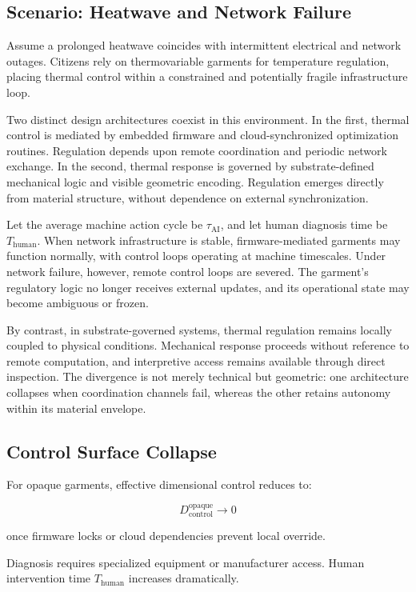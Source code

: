 \documentclass[11pt]{article}
\begin{document}
\subsection{Scenario: Heatwave and Network Failure}

Assume a prolonged heatwave coincides with intermittent electrical and
network outages. Citizens rely on thermovariable garments for
temperature regulation, placing thermal control within a constrained and
potentially fragile infrastructure loop.

Two distinct design architectures coexist in this environment. In the
first, thermal control is mediated by embedded firmware and
cloud-synchronized optimization routines. Regulation depends upon remote
coordination and periodic network exchange. In the second, thermal
response is governed by substrate-defined mechanical logic and visible
geometric encoding. Regulation emerges directly from material structure,
without dependence on external synchronization.

Let the average machine action cycle be $\tau_{\text{AI}}$, and let human
diagnosis time be $T_{\text{human}}$. When network infrastructure is
stable, firmware-mediated garments may function normally, with control
loops operating at machine timescales. Under network failure, however,
remote control loops are severed. The garment's regulatory logic no
longer receives external updates, and its operational state may become
ambiguous or frozen.

By contrast, in substrate-governed systems, thermal regulation remains
locally coupled to physical conditions. Mechanical response proceeds
without reference to remote computation, and interpretive access remains
available through direct inspection. The divergence is not merely
technical but geometric: one architecture collapses when coordination
channels fail, whereas the other retains autonomy within its material
envelope.

\subsection{Control Surface Collapse}

For opaque garments, effective dimensional control reduces to:

\[
D_{\text{control}}^{\text{opaque}} \rightarrow 0
\]

once firmware locks or cloud dependencies prevent local override.

Diagnosis requires specialized equipment or manufacturer access. 
Human intervention time $T_{\text{human}}$ increases dramatically.
\end{document}
